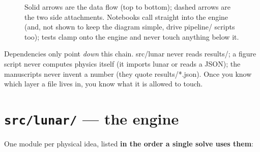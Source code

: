 \documentclass[11pt]{article}
\newcommand{\code}[1]{{\ttfamily\small #1}}
\begin{document}
\begin{figure}[h]
\caption{Solid arrows are the data flow (top to bottom); dashed arrows are
the two side attachments. Notebooks call straight into the engine (and, not
shown to keep the diagram simple, drive \code{pipeline/} scripts too); tests
clamp onto the engine and never touch anything below it.}
\label{fig:layers}
\end{figure}

\begin{rule box}
Dependencies only point \emph{down} this chain. \code{src/lunar} never reads
\code{results/}; a figure script never computes physics itself (it imports
\code{lunar} or reads a JSON); the manuscripts never invent a number (they
quote \code{results/*.json}). Once you know which layer a file lives in, you
know what it is allowed to touch.
\end{rule box}

\section{\texttt{src/lunar/} --- the engine}

One module per physical idea, listed \textbf{in the order a single solve uses
them}:
\end{document}
